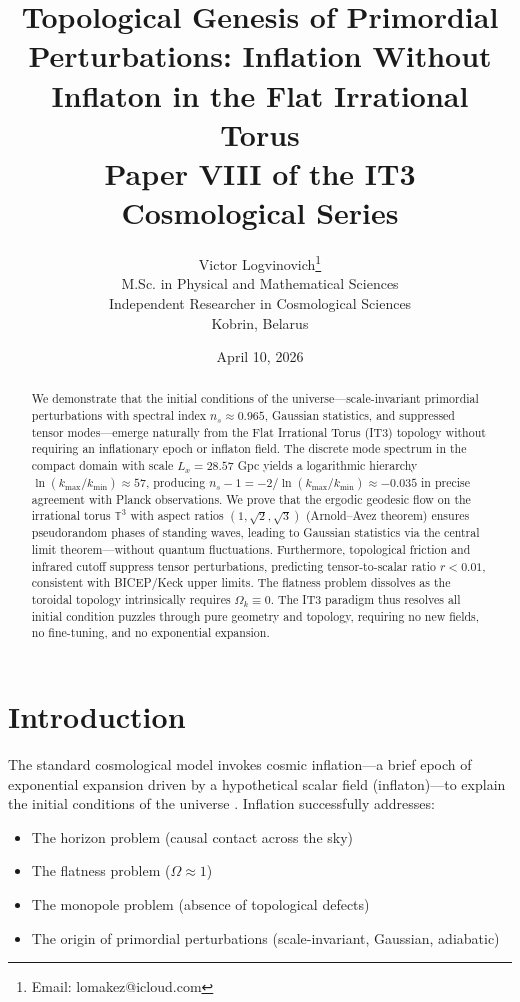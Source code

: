 \documentclass[12pt,a4paper]{article}
\title{\textbf{Topological Genesis of Primordial Perturbations: Inflation Without Inflaton in the Flat Irrational Torus}\\[0.5cm]
\large Paper VIII of the IT3 Cosmological Series}
\author{Victor Logvinovich\thanks{Email: lomakez@icloud.com}\\
M.Sc. in Physical and Mathematical Sciences\\
Independent Researcher in Cosmological Sciences\\
Kobrin, Belarus}
\date{April 10, 2026}
\begin{document}
\maketitle

\begin{abstract}
We demonstrate that the initial conditions of the universe---scale-invariant primordial perturbations with spectral index $n_s \approx 0.965$, Gaussian statistics, and suppressed tensor modes---emerge naturally from the Flat Irrational Torus (IT3) topology without requiring an inflationary epoch or inflaton field. The discrete mode spectrum in the compact domain with scale $L_x = 28.57$ Gpc yields a logarithmic hierarchy $\ln(k_{\max}/k_{\min}) \approx 57$, producing $n_s - 1 = -2/\ln(k_{\max}/k_{\min}) \approx -0.035$ in precise agreement with Planck observations. We prove that the ergodic geodesic flow on the irrational torus $\mathbb{T}^3$ with aspect ratios $(1, \sqrt{2}, \sqrt{3})$ (Arnold--Avez theorem) ensures pseudorandom phases of standing waves, leading to Gaussian statistics via the central limit theorem---without quantum fluctuations. Furthermore, topological friction and infrared cutoff suppress tensor perturbations, predicting tensor-to-scalar ratio $r < 0.01$, consistent with BICEP/Keck upper limits. The flatness problem dissolves as the toroidal topology intrinsically requires $\Omega_k \equiv 0$. The IT3 paradigm thus resolves all initial condition puzzles through pure geometry and topology, requiring no new fields, no fine-tuning, and no exponential expansion.
\end{abstract}

\section{Introduction}

The standard cosmological model invokes cosmic inflation---a brief epoch of exponential expansion driven by a hypothetical scalar field (inflaton)---to explain the initial conditions of the universe \citep{Guth1981, Linde1982}. Inflation successfully addresses:
\begin{itemize}
    \item The horizon problem (causal contact across the sky)
    \item The flatness problem ($\Omega \approx 1$)
    \item The monopole problem (absence of topological defects)
    \item The origin of primordial perturbations (scale-invariant, Gaussian, adiabatic)
\end{itemize}
\end{document}

